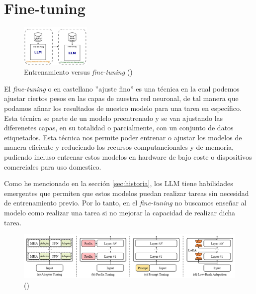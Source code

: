 \section{Fine-tuning}
\label{sec:fine_tuning}

\begin{figure}
    \centering
    \includegraphics[width=0.3\textwidth]{figuras/Capitulo_09/TrainVSFinetuning.png}
    \caption[Entrenamiento versus \textit{fine-tuning}]{Entrenamiento versus \textit{fine-tuning} (\cite{SupervisedFineTuning})}
    \label{fig:finetuningVStraining}
\end{figure}

El \textit{fine-tuning} o en castellano ''ajuste fino'' es una técnica en la cual podemos ajustar 
ciertos pesos en las capas de nuestra red neuronal, de tal manera que podamos afinar los
resultados de nuestro modelo para una tarea en específico. Esta técnica se parte de un
modelo preentrenado y se van ajustando las diferenetes capas, en su totalidad o parcialmente,
con un conjunto de datos etiquetados. Esta técnica nos permite poder entrenar o ajustar los
modelos de manera eficiente y reduciendo los recursos computancionales y de memoria, pudiendo
incluso entrenar estos modelos en hardware de bajo coste o dispositivos comerciales para 
uso domestico.

Como he mencionado en la sección \ref{sec:historia}, los LLM tiene habilidades emergentes
que permiten que estos modelos puedan realizar tareas sin necesidad de entrenamiento previo.
Por lo tanto, en el \textit{fine-tuning} no buscamos enseñar al modelo como realizar una tarea si no 
mejorar la capacidad de realizar dicha tarea. \cite{Finetuning}

\begin{figure}[H]
    \begin{center}
      \includegraphics[width=15cm]{figuras/Capitulo_09/Finetuning.png}
    \end{center}
    \caption[]{(\cite{Finetuning})}
    \label{fig:finetuning}
\end{figure}\

